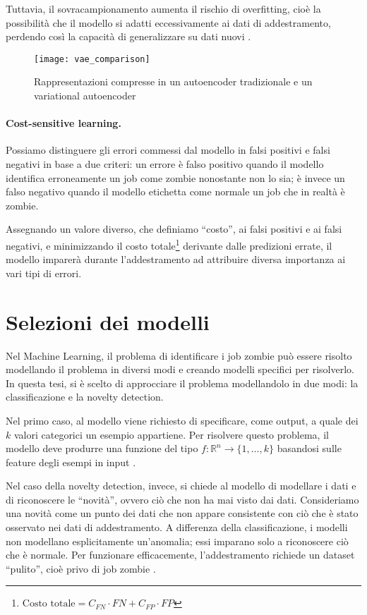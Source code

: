 Tuttavia, il sovracampionamento aumenta il rischio di overfitting, cioè la
possibilità che il modello si adatti eccessivamente ai dati di addestramento,
perdendo così la capacità di generalizzare su dati nuovi \cite{fernandez2018}.

\begin{figure}
    \centering
    \texttt{[image: vae\_comparison]}
    \caption{Rappresentazioni compresse in un autoencoder tradizionale e un
    variational autoencoder \cite{shafkat2018}}
    \label{fig:vae_comparison}
\end{figure}

\paragraph{Cost-sensitive learning.}

Possiamo distinguere gli errori commessi dal modello in falsi positivi e falsi
negativi in base a due criteri: un errore è falso positivo quando il modello
identifica erroneamente un job come zombie nonostante non lo sia; è invece un
falso negativo quando il modello etichetta come normale un job che in realtà è
zombie.

Assegnando un valore diverso, che definiamo ``costo'', ai falsi positivi e ai
falsi negativi, e minimizzando il costo totale\footnote{$\text{Costo totale} =
    C_{FN} \cdot
FN + C_{FP} \cdot FP$} derivante dalle predizioni
errate, il modello imparerà durante l'addestramento ad attribuire diversa
importanza ai vari tipi di errori.

\section{Selezioni dei modelli}

Nel Machine Learning, il problema di identificare i job zombie può essere
risolto modellando il problema in diversi modi e creando modelli specifici per
risolverlo. In questa tesi, si è scelto di approcciare il problema
modellandolo in due modi: la classificazione e la novelty detection.

Nel primo caso, al modello viene richiesto di specificare, come output, a
quale dei $k$ valori categorici un esempio appartiene. Per risolvere questo
problema, il modello deve produrre una funzione del tipo
$f:\mathbb{R}^n\to\{1,\ldots,k\}$ basandosi sulle feature degli esempi in
input \cite{Goodfellow2016}.

Nel caso della novelty detection, invece, si chiede al modello di modellare i
dati e di riconoscere le ``novità'', ovvero ciò che non ha mai visto dai dati.
Consideriamo una novità come un punto dei dati che non appare consistente con
ciò che è stato osservato nei dati di addestramento. A differenza della
classificazione, i  modelli non modellano esplicitamente un'anomalia; essi
imparano solo a riconoscere ciò che è normale. Per funzionare efficacemente,
l'addestramento richiede un dataset ``pulito'', cioè privo di job zombie
\cite{geron2019, pimentel2014}.

